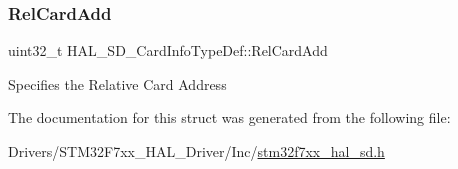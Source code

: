 \subsubsection{\texorpdfstring{RelCardAdd}{RelCardAdd}}
{\footnotesize\ttfamily uint32\+\_\+t H\+A\+L\+\_\+\+S\+D\+\_\+\+Card\+Info\+Type\+Def\+::\+Rel\+Card\+Add}

Specifies the Relative Card Address 

The documentation for this struct was generated from the following file\+:\begin{DoxyCompactItemize}
\item 
Drivers/\+S\+T\+M32\+F7xx\+\_\+\+H\+A\+L\+\_\+\+Driver/\+Inc/\mbox{\hyperlink{stm32f7xx__hal__sd_8h}{stm32f7xx\+\_\+hal\+\_\+sd.\+h}}\end{DoxyCompactItemize}
